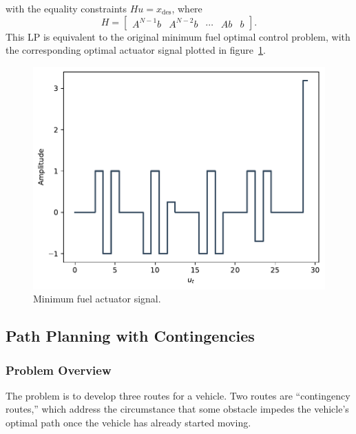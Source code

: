 \documentclass[12pt,reqno]{article}
\theoremstyle{definition}
\numberwithin{equation}{section}
\begin{document}
    with the equality constraints $Hu = x_{\mathrm{des}}$, where
    \[H = \begin{bmatrix}
        A^{N-1}b & A^{N-2}b & \cdots & Ab & b
    \end{bmatrix}.\]
    This LP is equivalent to the original minimum fuel optimal control problem, with the corresponding optimal actuator signal
    plotted in figure~\ref{fig:4-16_min-fuel}.
   

   \begin{figure}[htbp]
    \centering
    \includegraphics[width=\linewidth]{../examples/364a/cvx-ch4/4-16_min-fuel.pdf}
    \caption{Minimum fuel actuator signal.}
    \label{fig:4-16_min-fuel}
    \end{figure}

\newpage
\subsection{Path Planning with Contingencies}

\subsubsection*{Problem Overview}

The problem is to develop three routes for a vehicle. Two routes are ``contingency routes,''
which address the circumstance that some obstacle impedes the vehicle's optimal path once
the vehicle has already started moving.
\end{document}
